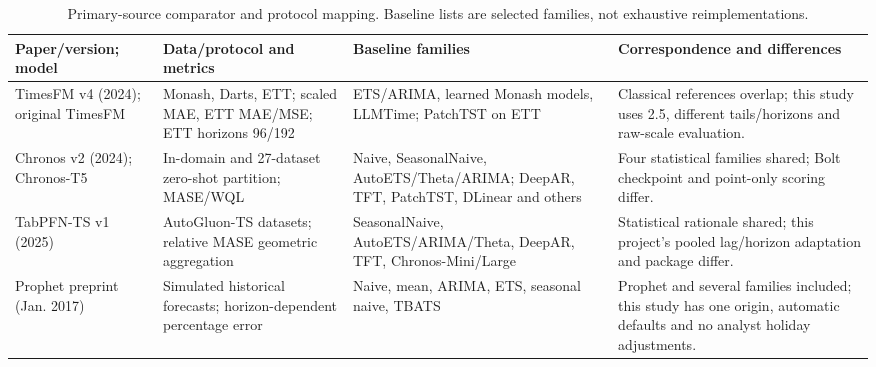 \begin{table}[!htbp]\centering\footnotesize
\caption{Primary-source comparator and protocol mapping. Baseline lists are selected families, not exhaustive reimplementations.}\label{tab:papers}
\begin{tabular}{>{\raggedright\arraybackslash}p{.15\linewidth}>{\raggedright\arraybackslash}p{.23\linewidth}>{\raggedright\arraybackslash}p{.23\linewidth}>{\raggedright\arraybackslash}p{.28\linewidth}}\hline
Paper/version; model & Data/protocol and metrics & Baseline families & Correspondence and differences \\\hline
TimesFM v4 (2024); original TimesFM~\cite{timesfm_paper} & Monash, Darts, ETT; scaled MAE, ETT MAE/MSE; ETT horizons 96/192 & ETS/ARIMA, learned Monash models, LLMTime; PatchTST on ETT & Classical references overlap; this study uses 2.5, different tails/horizons and raw-scale evaluation. \\
Chronos v2 (2024); Chronos-T5\newline\cite{chronos_paper} & In-domain and 27-dataset zero-shot partition; MASE/WQL & Naive, SeasonalNaive, AutoETS/Theta/ARIMA; DeepAR, TFT, PatchTST, DLinear and others & Four statistical families shared; Bolt checkpoint and point-only scoring differ. \\
TabPFN-TS v1 (2025)~\cite{tabpfn_ts} & 24 AutoGluon-TS datasets; relative MASE geometric aggregation & SeasonalNaive, AutoETS/ARIMA/Theta, DeepAR, TFT, Chronos-Mini/Large & Statistical rationale shared; this project's pooled lag/horizon adaptation and package differ. \\
Prophet preprint (Jan. 2017)~\cite{prophet_paper} & Simulated historical forecasts; horizon-dependent percentage error & Naive, mean, ARIMA, ETS, seasonal naive, TBATS & Prophet and several families included; this study has one origin, automatic defaults and no analyst holiday adjustments. \\\hline
\end{tabular}\end{table}
